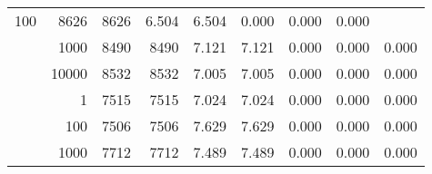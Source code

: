 \begin{table}
\begin{tabular}{rrrrrrrrr}
					\multirow{ 1 }{*}{ 100 } &
					
						
							    
							     8626  & 8626  
	                           & 6.504 & 6.504 & 0.000
	                           & 0.000 & 0.000  \\
	                
	            
					 &  
					 
					\multirow{ 1 }{*}{ 1000 } &
					
						
							    
							     8490  & 8490  
	                           & 7.121 & 7.121 & 0.000
	                           & 0.000 & 0.000  \\
	                
	            
					 &  
					 
					\multirow{ 1 }{*}{ 10000 } &
					
						
							    
							     8532  & 8532  
	                           & 7.005 & 7.005 & 0.000
	                           & 0.000 & 0.000  \\
	                
	            
	        
				\noalign{\smallskip}\hline
				\multirow{ 4 }{*}{ 250000 } &
				
					
					 
					\multirow{ 1 }{*}{ 1 } &
					
						
							    
							     7515  & 7515  
	                           & 7.024 & 7.024 & 0.000
	                           & 0.000 & 0.000  \\
	                
	            
					 &  
					 
					\multirow{ 1 }{*}{ 100 } &
					
						
							    
							     7506  & 7506  
	                           & 7.629 & 7.629 & 0.000
	                           & 0.000 & 0.000  \\
	                
	            
					 &  
					 
					\multirow{ 1 }{*}{ 1000 } &
					
						
							    
							     7712  & 7712  
	                           & 7.489 & 7.489 & 0.000
	                           & 0.000 & 0.000  \\
	                

\end{tabular}
\end{table}
